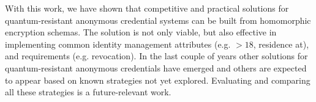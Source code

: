 With this work, we have shown that competitive and practical solutions for quantum-resistant anonymous credential systems can be built from homomorphic encryption schemas. The solution is not only viable, but also effective in implementing common identity management attributes (e.g. $>18$, residence at), and requirements (e.g. revocation). In the last couple of years other solutions for quantum-resistant anonymous credentials have emerged and others are expected to appear based on known strategies not yet explored. Evaluating and comparing all these strategies is a future-relevant work.